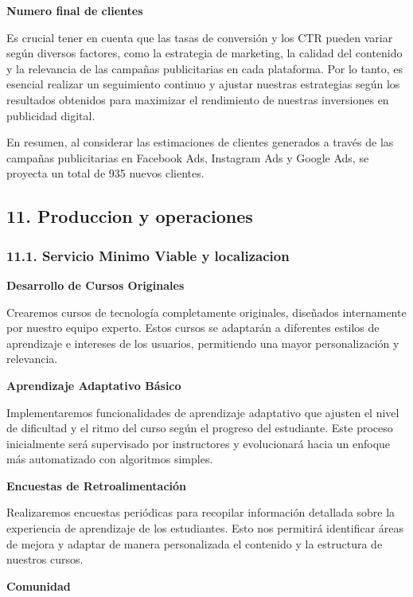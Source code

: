 \documentclass[
]{article}
\begin{document}
\textbf{Numero final de clientes}

Es crucial tener en cuenta que las tasas de conversión y los CTR pueden
variar según diversos factores, como la estrategia de marketing, la
calidad del contenido y la relevancia de las campañas publicitarias en
cada plataforma. Por lo tanto, es esencial realizar un seguimiento
continuo y ajustar nuestras estrategias según los resultados obtenidos
para maximizar el rendimiento de nuestras inversiones en publicidad
digital.

En resumen, al considerar las estimaciones de clientes generados a
través de las campañas publicitarias en Facebook Ads, Instagram Ads y
Google Ads, se proyecta un total de 935 nuevos clientes.

\newpage

\subsection{11. Produccion y
operaciones}\label{produccion-y-operaciones}

\subsubsection{11.1. Servicio Minimo Viable y
localizacion}\label{servicio-minimo-viable-y-localizacion}

\textbf{Desarrollo de Cursos Originales}

Crearemos cursos de tecnología completamente originales, diseñados
internamente por nuestro equipo experto. Estos cursos se adaptarán a
diferentes estilos de aprendizaje e intereses de los usuarios,
permitiendo una mayor personalización y relevancia.

\textbf{Aprendizaje Adaptativo Básico}

Implementaremos funcionalidades de aprendizaje adaptativo que ajusten el
nivel de dificultad y el ritmo del curso según el progreso del
estudiante. Este proceso inicialmente será supervisado por instructores
y evolucionará hacia un enfoque más automatizado con algoritmos simples.

\textbf{Encuestas de Retroalimentación}

Realizaremos encuestas periódicas para recopilar información detallada
sobre la experiencia de aprendizaje de los estudiantes. Esto nos
permitirá identificar áreas de mejora y adaptar de manera personalizada
el contenido y la estructura de nuestros cursos.

\textbf{Comunidad}
\end{document}
